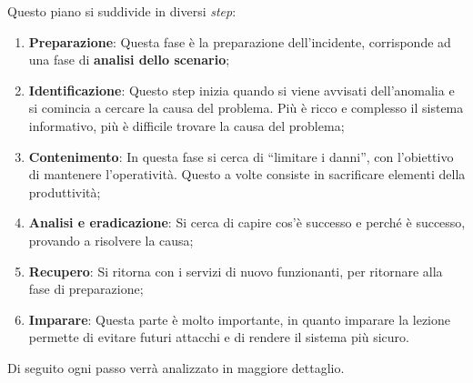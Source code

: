 Questo piano si suddivide in diversi \textit{step}:
\begin{enumerate}
\item \textbf{Preparazione}: Questa fase è la preparazione dell'incidente,
corrisponde ad una fase di \textbf{analisi dello scenario};

\item \textbf{Identificazione}: Questo step inizia quando si viene
avvisati dell'anomalia e si comincia a cercare la causa del problema. 
Più è ricco e complesso il sistema informativo, più è difficile trovare
la causa del problema;

\item \textbf{Contenimento}: In questa fase si cerca di ``limitare i 
danni'', con l'obiettivo di mantenere l'operatività. Questo a volte 
consiste in  sacrificare elementi della produttività;

\item \textbf{Analisi e eradicazione}: Si cerca di capire cos'è successo
e perché è successo, provando a risolvere la causa;

\item \textbf{Recupero}: Si ritorna con i servizi di nuovo funzionanti,
per ritornare alla fase di preparazione;

\item \textbf{Imparare}:  Questa parte è molto importante, in quanto 
imparare la lezione permette di evitare futuri attacchi e di rendere il
sistema più sicuro.

\end{enumerate}

Di seguito ogni passo verrà analizzato in maggiore dettaglio.
